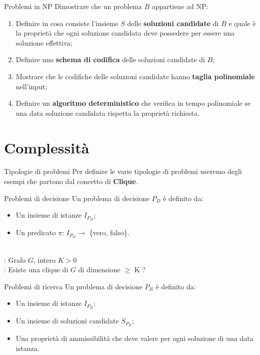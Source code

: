\documentclass[10pt,a4paper]{article}
\begin{document}
\begin{multicols}{3}
\begin{textbox}{Problemi in NP}
Dimostrare che un problema \(B\) appartiene ad NP:
\begin{enumerate}[leftmargin=*]
    \item Definire in cosa consiste l'insieme \(S\) delle \textbf{soluzioni candidate} di \(B\) e quale è la proprietà che ogni soluzione candidata deve possedere per essere una soluzione effettiva;
    \item Definire uno \textbf{schema di codifica} delle soluzioni candidate di \(B\);
    \item Mostrare che le codifiche delle soluzioni candidate hanno \textbf{taglia polinomiale} nell'input;
    \item Definire un \textbf{algoritmo deterministico} che verifica in tempo polinomiale se una data soluzione candidata rispetta la proprietà richiesta.
\end{enumerate}
\end{textbox}




\section{Complessità}

\begin{textbox}{Tipologie di problemi}
Per definire le varie tipologie di problemi useremo degli esempi che
partono dal concetto di \textbf{Clique}.\\

\begin{textbox}{Problemi di decisione}
Un problema di decisione \(P_D\) è definito da:
\begin{itemize}[leftmargin=*]
    \item Un insieme di istanze \(I_{P_D}\);
    \item Un predicato \(\pi\): \(I_{P_D} \rightarrow\) \{vero, falso\}.
\end{itemize}

\\
: Grafo \(G\), intero \(K > 0\) \\
: Esiste una clique di \(G\) di dimensione \(\geq\) K ?

\end{textbox}

\begin{textbox}{Problemi di ricerca}
Un problema di decisione \(P_R\) è definito da:
\begin{itemize}[leftmargin=*]
    \item Un insieme di istanze \(I_{P_R}\);
    \item Un insieme di soluzioni candidate  \(S_{P_R}\);
    \item Una proprietà di ammissibilità che deve valere per ogni soluzione di una
    data istanza.
\end{itemize}


\end{textbox}
\end{textbox}
\end{multicols}
\end{document}
